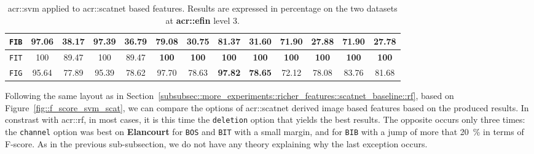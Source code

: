 \begin{sidewaystable}[htpb]
\begin{tabular}{| c | c c | c c | c c | c c | c c | c c |}
                    \texttt{FIB} & \textbf{97.06} & \textbf{38.17} & 97.39 & 36.79 & 79.08 & 30.75 & 81.37 & 31.60 & 71.90 & 27.88 & 71.90 & 27.78 \\
                    \hline
                    \texttt{FIT} & 100 & 89.47 & 100 & 89.47 & \textbf{100} & \textbf{100} & \textbf{100} & \textbf{100} & \textbf{100} & \textbf{100} & \textbf{100} & \textbf{100} \\
                    \hline
                    \texttt{FIG} & 95.64 & 77.89 & 95.39 & 78.62 & 97.70 & 78.63 & \textbf{97.82} & \textbf{78.65} & 72.12 & 78.08 & 83.76 & 81.68 \\
                    \hline
                \end{tabular}
                \caption{
                    \label{tab::stats_scat_svm_f3}
                    \gls{acr::svm} applied to \gls{acr::scatnet} based features.
                    Results are expressed in percentage on the two datasets at \textbf{\gls{acr::efin}} level 3.
                }
            \end{sidewaystable}

            Following the same layout as in Section~\ref{subsubsec::more_experiments::richer_features::scatnet_baseline::rf}, based on Figure~\ref{fig::f_score_svm_scat}, we can compare the options of \gls{acr::scatnet} derived image based features based on the produced results.
            In constrast with \gls{acr::rf}, in most cases, it is this time the \texttt{deletion} option that yields the best results.
            The opposite occurs only three times: the \texttt{channel} option was best on \textbf{Elancourt} for \texttt{BOS} and \texttt{BIT} with a small margin, and for \texttt{BIB} with a jump of more that \SI{20}{\percent} in terms of F-score.
            As in the previous sub-subsection, we do not have any theory explaining why the last exception occurs.\\
    
